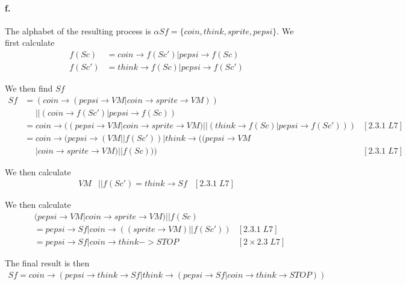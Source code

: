 \documentclass[a4paper, 11pt]{article}
\begin{document}
\paragraph{f.} %
\label{par:f_}

The alphabet of the resulting process is $\alpha Sf = \{coin, think, sprite, pepsi\}$. We first calculate
\begin{align*}
f(Sc) &= coin \rightarrow f(Sc') | pepsi \rightarrow f(Sc) \\
f(Sc') &= think \rightarrow f(Sc) | pepsi \rightarrow f(Sc')
\end{align*}

We then find $Sf$
\begin{align*}
Sf &= (coin \rightarrow (pepsi \rightarrow VM | coin \rightarrow sprite \rightarrow VM)) \\
   &\phantom{=} || (coin \rightarrow f(Sc') | pepsi \rightarrow f(Sc)) \\
   &= coin \rightarrow ( (pepsi \rightarrow VM | coin \rightarrow sprite \rightarrow VM) || (think \rightarrow f(Sc) | pepsi \rightarrow f(Sc')) ) & [2.3.1\;L7] \\
   &= coin \rightarrow (pepsi \rightarrow (VM || f(Sc')) | think \rightarrow ((pepsi \rightarrow VM \\
   &\phantom{=} | coin \rightarrow sprite \rightarrow VM) || f(Sc))) & [2.3.1\;L7]
\end{align*}

We then calculate
\begin{align*}
VM &|| f(Sc') = think \rightarrow Sf & [2.3.1\;L7]
\end{align*}

We then calculate
\begin{align*}
& (pepsi \rightarrow VM | coin \rightarrow sprite \rightarrow VM) || f(Sc) \\
&= pepsi \rightarrow Sf | coin \rightarrow ((sprite \rightarrow VM) || f(Sc')) & [2.3.1\;L7] \\
&= pepsi \rightarrow Sf | coin \rightarrow think -> STOP & [2\times2.3\;L7]
\end{align*}

The final result is then
\begin{align*}
Sf = coin \rightarrow (pepsi \rightarrow think \rightarrow Sf | think \rightarrow (pepsi \rightarrow Sf | coin \rightarrow think \rightarrow STOP))
\end{align*}

\end{document}
